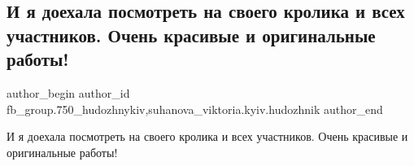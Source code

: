  
 
 
 
 

\subsection{И я доехала посмотреть на своего кролика и всех участников. Очень красивые и оригинальные работы!}
\label{sec:09_04_2018.fb.fb_group.750_hudozhnykiv.2.suhanova_i_ja_doehala_posmotret_na_svoego_krolika}
 
\ifcmt
 author_begin
   author_id fb_group.750_hudozhnykiv,suhanova_viktoria.kyiv.hudozhnik
 author_end
\fi

И я доехала посмотреть на своего кролика и всех участников. Очень красивые и
оригинальные работы!


